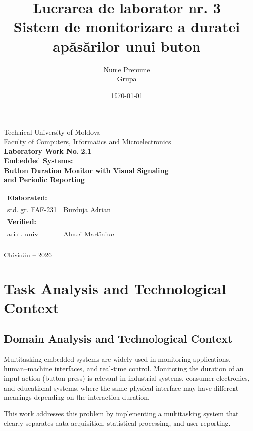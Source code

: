 \documentclass[12pt,a4paper]{article}
\title{Lucrarea de laborator nr. 3\\
Sistem de monitorizare a duratei apăsărilor unui buton}
\author{Nume Prenume\\Grupa}
\date{\today}
\begin{document}
\begin{titlepage}
\begin{center}
\vspace*{1cm}
{\Large Technical University of Moldova}\\[0.5cm]
{\Large Faculty of Computers, Informatics and Microelectronics}\\[2cm]
{\Huge\bfseries Laboratory Work No. 2.1}\\[1cm]
{\Large\bfseries Embedded Systems:\\
Button Duration Monitor with Visual Signaling\\
and Periodic Reporting}\\[3.5cm]
\begin{flushright}
\begin{tabular}{ll}
\textbf{Elaborated:} & \\
std. gr. FAF-231 & Burduja Adrian \\[1cm]
\textbf{Verified:} & \\
asist. univ. & Alexei Martîniuc \\ & \\
\end{tabular}
\end{flushright}
\vfill
{\Large Chișinău -- 2026}
\end{center}
\end{titlepage}
\tableofcontents
\newpage

\section{Task Analysis and Technological Context}

\subsection{Domain Analysis and Technological Context}
Multitasking embedded systems are widely used in monitoring applications,
human--machine interfaces, and real-time control. Monitoring the duration of an input action
(button press) is relevant in industrial systems, consumer electronics, and educational systems,
where the same physical interface may have different meanings depending on the interaction duration.

This work addresses this problem by implementing a multitasking system that clearly separates
data acquisition, statistical processing, and user reporting.
\end{document}
